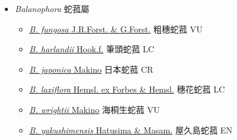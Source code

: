 
  \begin{itemize}
 \item[] \textit{Balanophora} 蛇菰屬
                    
  \begin{itemize}
        \item[] \href{http://www.theplantlist.org/tpl1.1/search?q=Balanophora+fungosa}{\textit{B. fungosa} J.R.Forst. \& G.Forst.}   粗穗蛇菰 VU
        \item[] \href{http://www.theplantlist.org/tpl1.1/search?q=Balanophora+harlandii}{\textit{B. harlandii} Hook.f.}   筆頭蛇菰 LC
        \item[] \href{http://www.theplantlist.org/tpl1.1/search?q=Balanophora+japonica}{\textit{B. japonica} Makino}   日本蛇菰 CR
        \item[] \href{http://www.theplantlist.org/tpl1.1/search?q=Balanophora+laxiflora}{\textit{B. laxiflora} Hemsl. ex Forbes \& Hemsl.}   穗花蛇菰 LC
        \item[] \href{http://www.theplantlist.org/tpl1.1/search?q=Balanophora+wrightii}{\textit{B. wrightii} Makino}   海桐生蛇菰 VU
        \item[] \href{http://www.theplantlist.org/tpl1.1/search?q=Balanophora+yakushimensis}{\textit{B. yakushimensis} Hatusima \& Masam.}   屋久島蛇菰 EN
  \end{itemize}
  \end{itemize}
